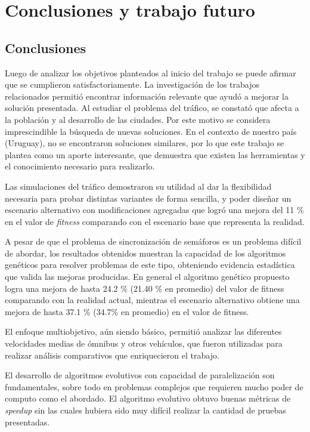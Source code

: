 \chapter{Conclusiones y trabajo futuro}

\section{Conclusiones}
Luego de analizar los objetivos planteados al inicio del trabajo se puede afirmar que se cumplieron satisfactoriamente.
La investigación de los trabajos relacionados permitió encontrar información relevante que ayudó a mejorar la solución presentada. 
Al estudiar el problema del tráfico, se constató  que afecta a la población y al desarrollo de las ciudades. Por este motivo se considera imprescindible la búsqueda de nuevas soluciones. En el contexto de nuestro país (Uruguay), no se encontraron soluciones similares, por lo que este trabajo se plantea como un aporte interesante, que demuestra que existen las herramientas y el conocimiento necesario para realizarlo.
 
Las simulaciones del tráfico demostraron su utilidad al dar la flexibilidad necesaria para probar distintas variantes de forma sencilla, y poder diseñar un escenario alternativo con modificaciones agregadas que logró una mejora del 11 \% en el valor de \emph{fitness} comparando con el escenario base que representa la realidad.
 
A pesar de que el problema de sincronización de semáforos es un problema difícil de abordar, los resultados obtenidos muestran la capacidad de los algoritmos genéticos para resolver problemas de este tipo, obteniendo evidencia estadística que valida las mejoras producidas. En general el algoritmo genético propuesto logra una mejora de hasta  24.2 \% (21.40 \% en promedio) del valor de fitness comparando con la realidad actual, mientras el escenario alternativo obtiene una mejora de hasta 37.1 \% (34.7\% en promedio) en el valor de fitness.

El enfoque multiobjetivo, aún siendo básico, permitió analizar las diferentes velocidades medias de ómnibus y otros vehículos, que fueron utilizadas para realizar análisis comparativos que enriquecieron el trabajo.

El desarrollo de algoritmos evolutivos con capacidad de paralelización son fundamentales, sobre todo en problemas complejos que requieren mucho poder de computo como el abordado. El algoritmo evolutivo obtuvo buenas métricas de \emph{speedup} sin las cuales hubiera sido muy difícil realizar la cantidad de pruebas presentadas.

